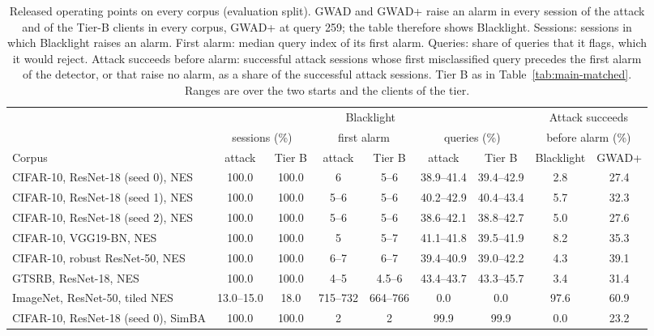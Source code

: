 \begin{table}[!tbp]
\centering\footnotesize\setlength{\tabcolsep}{4pt}
\caption{Released operating points on every corpus (evaluation split). GWAD and GWAD+ raise an alarm in every session of the attack and of the Tier-B clients in every corpus, GWAD+ at query 259; the table therefore shows Blacklight. Sessions: sessions in which Blacklight raises an alarm. First alarm: median query index of its first alarm. Queries: share of queries that it flags, which it would reject. Attack succeeds before alarm: successful attack sessions whose first misclassified query precedes the first alarm of the detector, or that raise no alarm, as a share of the successful attack sessions. Tier B as in Table~\ref{tab:main-matched}. Ranges are over the two starts and the clients of the tier.}
\label{tab:released}
\vspace{3pt}
\begin{adjustbox}{max width=\textwidth}
\begin{tabular}{lcccccccc}
\toprule
& \multicolumn{6}{c}{Blacklight} & \multicolumn{2}{c}{Attack succeeds} \\
& \multicolumn{2}{c}{sessions (\%)} & \multicolumn{2}{c}{first alarm} & \multicolumn{2}{c}{queries (\%)} & \multicolumn{2}{c}{before alarm (\%)} \\
\cmidrule(lr){2-3}\cmidrule(lr){4-5}\cmidrule(lr){6-7}\cmidrule(lr){8-9}
Corpus & attack & Tier B & attack & Tier B & attack & Tier B & Blacklight & GWAD+ \\
\midrule
CIFAR-10, ResNet-18 (seed 0), NES & 100.0 & 100.0 & 6 & 5--6 & 38.9--41.4 & 39.4--42.9 & 2.8 & 27.4 \\
CIFAR-10, ResNet-18 (seed 1), NES & 100.0 & 100.0 & 5--6 & 5--6 & 40.2--42.9 & 40.4--43.4 & 5.7 & 32.3 \\
CIFAR-10, ResNet-18 (seed 2), NES & 100.0 & 100.0 & 5--6 & 5--6 & 38.6--42.1 & 38.8--42.7 & 5.0 & 27.6 \\
CIFAR-10, VGG19-BN, NES & 100.0 & 100.0 & 5 & 5--7 & 41.1--41.8 & 39.5--41.9 & 8.2 & 35.3 \\
CIFAR-10, robust ResNet-50, NES & 100.0 & 100.0 & 6--7 & 6--7 & 39.4--40.9 & 39.0--42.2 & 4.3 & 39.1 \\
GTSRB, ResNet-18, NES & 100.0 & 100.0 & 4--5 & 4.5--6 & 43.4--43.7 & 43.3--45.7 & 3.4 & 31.4 \\
ImageNet, ResNet-50, tiled NES & 13.0--15.0 & 18.0 & 715--732 & 664--766 & 0.0 & 0.0 & 97.6 & 60.9 \\
CIFAR-10, ResNet-18 (seed 0), SimBA & 100.0 & 100.0 & 2 & 2 & 99.9 & 99.9 & 0.0 & 23.2 \\
\bottomrule
\end{tabular}
\end{adjustbox}
\end{table}
